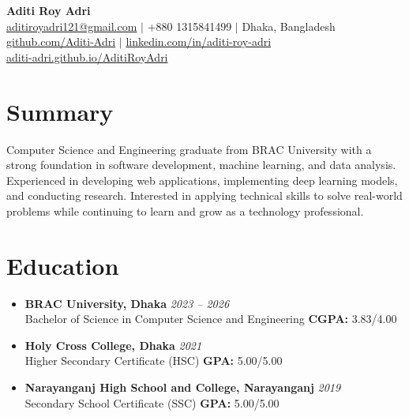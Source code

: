 \documentclass[a4paper,11pt]{article}
\newcommand{\cvmeta}[1]{\textcolor{cvmuted}{\textit{#1}}}
\begin{document}
\begin{center}
    {\LARGE\bfseries\color{cvnavy} Aditi Roy Adri}\\[4pt]
    \href{mailto:aditiroyadri121@gmail.com}{aditiroyadri121@gmail.com} $|$ +880 1315841499 $|$ Dhaka, Bangladesh\\[3pt]
    \href{https://github.com/Aditi-Adri}{github.com/Aditi-Adri} $|$
    \href{https://www.linkedin.com/in/aditi-roy-adri/}{linkedin.com/in/aditi-roy-adri}\\[3pt]
    \href{https://aditi-adri.github.io/AditiRoyAdri/}{aditi-adri.github.io/AditiRoyAdri}
\end{center}

\section*{Summary}
Computer Science and Engineering graduate from BRAC University with a strong foundation in software development, machine learning, and data analysis. Experienced in developing web applications, implementing deep learning models, and conducting research. Interested in applying technical skills to solve real-world problems while continuing to learn and grow as a technology professional.

\section*{Education}
\begin{itemize}[leftmargin=*, itemsep=5pt, parsep=0pt, topsep=3pt]
    \item \textbf{BRAC University, Dhaka} \hfill \cvmeta{2023 -- 2026}\\
    Bachelor of Science in Computer Science and Engineering \hfill \textbf{CGPA:} 3.83/4.00

    \item \textbf{Holy Cross College, Dhaka} \hfill \cvmeta{2021}\\
    Higher Secondary Certificate (HSC) \hfill \textbf{GPA:} 5.00/5.00

    \item \textbf{Narayanganj High School and College, Narayanganj} \hfill \cvmeta{2019}\\
    Secondary School Certificate (SSC) \hfill \textbf{GPA:} 5.00/5.00
\end{itemize}

\end{document}

